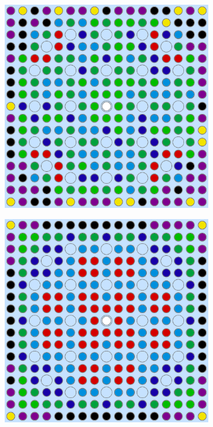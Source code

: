 \begin{figure}[h!]
\begin{subfigure}{0.47\textwidth}
  \caption{}
  \label{fig:chap10-assm-16-combined-4}
\end{subfigure}
\begin{subfigure}{0.47\textwidth}
  \centering
  \includegraphics[width=0.9\linewidth]{figures/unsupervised/geometries/with-features/8-clusters/pinch/assm-16}
  \caption{}
  \label{fig:chap10-assm-16-pinch-8}
\end{subfigure}%
\begin{subfigure}{0.47\textwidth}
  \centering
  \includegraphics[width=0.9\linewidth]{figures/unsupervised/geometries/with-features/8-clusters/combined/assm-16}

\end{subfigure}
\end{figure}
